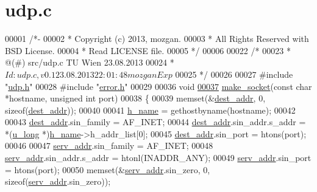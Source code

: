 \hypertarget{udp_8c_source}{\section{udp.\+c}
\label{udp_8c_source}
}

\begin{DoxyCode}
00001 \textcolor{comment}{/*-}
00002 \textcolor{comment}{ * Copyright (c) 2013, mozgan.}
00003 \textcolor{comment}{ * All Rights Reserved with BSD License.}
00004 \textcolor{comment}{ * Read LICENSE file.}
00005 \textcolor{comment}{ */}
00006 
00022 \textcolor{comment}{/*}
00023 \textcolor{comment}{ *      @(#) src/udp.c      TU Wien 23.08.2013}
00024 \textcolor{comment}{ *  $Id: udp.c,v 0.1 23.08.2013 22:01:48 mozgan Exp $}
00025 \textcolor{comment}{ */}
00026 
00027 \textcolor{preprocessor}{#include "\hyperlink{udp_8h}{udp.h}"}
00028 \textcolor{preprocessor}{#include "\hyperlink{error_8h}{error.h}"}
00029 
00036 \textcolor{keywordtype}{void}
\hypertarget{udp_8c_source_l00037}{}\hyperlink{udp_8h_af62eaae41c3f2e3caa57d3735a0ec053}{00037} \hyperlink{udp_8c_af78c25c84b170f47fc907e752c1409b4}{make\_socket}(\textcolor{keyword}{const} \textcolor{keywordtype}{char} *hostname, \textcolor{keywordtype}{unsigned} \textcolor{keywordtype}{int} port)
00038 \{
00039         memset(&\hyperlink{udp_8h_a072220ecebc8a6044aca4afa78eefebd}{dest\_addr}, 0, \textcolor{keyword}{sizeof}(\hyperlink{udp_8h_a072220ecebc8a6044aca4afa78eefebd}{dest\_addr}));
00040 
00041         \hyperlink{udp_8h_aecc6f69775dc6fdfbfde27f60b417932}{h\_name} = gethostbyname(hostname);
00042 
00043         \hyperlink{udp_8h_a072220ecebc8a6044aca4afa78eefebd}{dest\_addr}.sin\_family = AF\_INET;
00044         \hyperlink{udp_8h_a072220ecebc8a6044aca4afa78eefebd}{dest\_addr}.sin\_addr.s\_addr = *(\hyperlink{udp_8h_aaf12d2783d89167480b76853da8ba5e1}{u\_long} *)\hyperlink{udp_8h_aecc6f69775dc6fdfbfde27f60b417932}{h\_name}->h\_addr\_list[0];
00045         \hyperlink{udp_8h_a072220ecebc8a6044aca4afa78eefebd}{dest\_addr}.sin\_port = htons(port);
00046 
00047         \hyperlink{udp_8h_ac724fe70ae8af2d1406927ee7b574a1b}{serv\_addr}.sin\_family = AF\_INET;
00048         \hyperlink{udp_8h_ac724fe70ae8af2d1406927ee7b574a1b}{serv\_addr}.sin\_addr.s\_addr = htonl(INADDR\_ANY);
00049         \hyperlink{udp_8h_ac724fe70ae8af2d1406927ee7b574a1b}{serv\_addr}.sin\_port = htons(port);
00050         memset(&\hyperlink{udp_8h_ac724fe70ae8af2d1406927ee7b574a1b}{serv\_addr}.sin\_zero, 0, \textcolor{keyword}{sizeof}(\hyperlink{udp_8h_ac724fe70ae8af2d1406927ee7b574a1b}{serv\_addr}.sin\_zero));

\end{DoxyCode}
